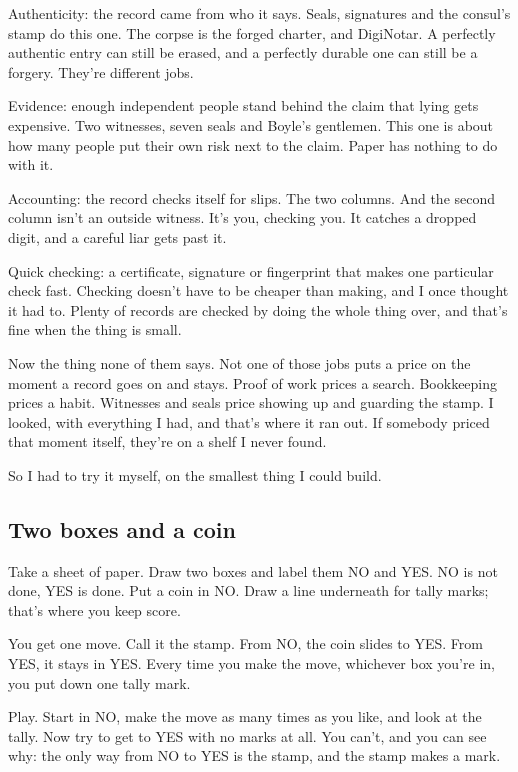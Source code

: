 \documentclass[11pt,twoside]{article}
\theoremstyle{thielethm}
\theoremstyle{thieledef}
\theoremstyle{thieledef}
\theoremstyle{thieledef}
\theoremstyle{thielethm}
\theoremstyle{thieleobs}
\theoremstyle{thielethm}
\begin{document}
Authenticity: the record came from who it says. Seals, signatures and the consul's stamp do this one. The corpse is the forged charter, and DigiNotar. A perfectly authentic entry can still be erased, and a perfectly durable one can still be a forgery. They're different jobs.

Evidence: enough independent people stand behind the claim that lying gets expensive. Two witnesses, seven seals and Boyle's gentlemen. This one is about how many people put their own risk next to the claim. Paper has nothing to do with it.

Accounting: the record checks itself for slips. The two columns. And the second column isn't an outside witness. It's you, checking you. It catches a dropped digit, and a careful liar gets past it.

Quick checking: a certificate, signature or fingerprint that makes one particular check fast. Checking doesn't have to be cheaper than making, and I once thought it had to. Plenty of records are checked by doing the whole thing over, and that's fine when the thing is small.

Now the thing none of them says. Not one of those jobs puts a price on the moment a record goes on and stays. Proof of work prices a search. Bookkeeping prices a habit. Witnesses and seals price showing up and guarding the stamp. I looked, with everything I had, and that's where it ran out. If somebody priced that moment itself, they're on a shelf I never found.

So I had to try it myself, on the smallest thing I could build.

\subsection{Two boxes and a coin}

Take a sheet of paper. Draw two boxes and label them NO and YES. NO is not done, YES is done. Put a coin in NO. Draw a line underneath for tally marks; that's where you keep score.

You get one move. Call it the stamp. From NO, the coin slides to YES. From YES, it stays in YES. Every time you make the move, whichever box you're in, you put down one tally mark.

Play. Start in NO, make the move as many times as you like, and look at the tally. Now try to get to YES with no marks at all. You can't, and you can see why: the only way from NO to YES is the stamp, and the stamp makes a mark.
\end{document}
